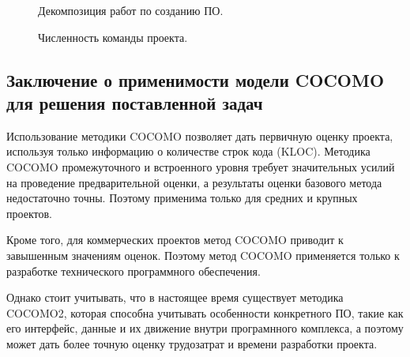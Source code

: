 \documentclass[a4paper,14pt]{article}
\begin{document}
 \begin{figure}[!h]
     \caption{Декомпозиция работ по созданию ПО.}
     \label{fig:cycle}
 \end{figure}

 \begin{figure}[!h]
     \caption{Численность команды проекта.}
     \label{fig:workers}
 \end{figure}

\newpage
\subsection*{Заключение о применимости модели COCOMO для решения поставленной задач}

Использование методики COCOMO позволяет дать первичную оценку проекта, используя только информацию о количестве строк кода (KLOC).
Методика COCOMO промежуточного и встроенного уровня требует значительных усилий на проведение предварительной оценки, а результаты оценки базового метода недостаточно точны. Поэтому применима только для средних и крупных проектов.

Кроме того, для коммерческих проектов метод COCOMO приводит к завышенным значениям оценок. Поэтому метод COCOMO применяется только к разработке технического программного обеспечения.

Однако стоит учитывать, что в настоящее время существует методика COCOMO2, которая способна учитывать особенности конкретного ПО, такие как его интерфейс, данные и их движение внутри програмнного комплекса, а поэтому может дать более точную оценку трудозатрат и времени разработки проекта.
\end{document}
